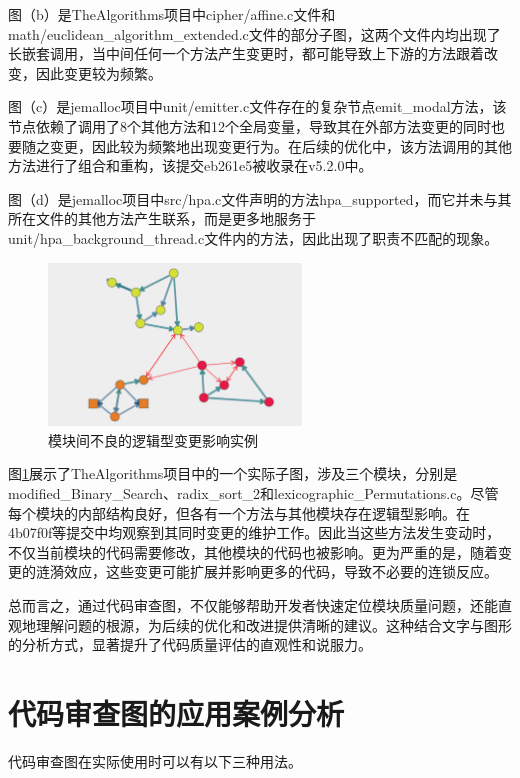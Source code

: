 图（b）是TheAlgorithms项目中cipher/affine.c文件和math/euclidean\_algorithm\_extended.c文件的部分子图，这两个文件内均出现了长嵌套调用，当中间任何一个方法产生变更时，都可能导致上下游的方法跟着改变，因此变更较为频繁。

图（c）是jemalloc项目中unit/emitter.c文件存在的复杂节点emit\_modal方法，该节点依赖了调用了8个其他方法和12个全局变量，导致其在外部方法变更的同时也要随之变更，因此较为频繁地出现变更行为。在后续的优化中，该方法调用的其他方法进行了组合和重构，该提交eb261e5被收录在v5.2.0中。

图（d）是jemalloc项目中src/hpa.c文件声明的方法hpa\_supported，而它并未与其所在文件的其他方法产生联系，而是更多地服务于unit/hpa\_background\_thread.c文件内的方法，因此出现了职责不匹配的现象。

\begin{figure}[h]
\centering
\includegraphics[width = 0.6\textwidth]{figures/不良变更影响.png}
\caption{模块间不良的逻辑型变更影响实例}
\label{1_不良的逻辑型变更影响实例}
\end{figure}


图\ref{1_不良的逻辑型变更影响实例}展示了TheAlgorithms项目中的一个实际子图，涉及三个模块，分别是modified\_Binary\_Search、radix\_sort\_2和lexicographic\_Permutations.c。尽管每个模块的内部结构良好，但各有一个方法与其他模块存在逻辑型影响。在4b07f0f等提交中均观察到其同时变更的维护工作。因此当这些方法发生变动时，不仅当前模块的代码需要修改，其他模块的代码也被影响。更为严重的是，随着变更的涟漪效应，这些变更可能扩展并影响更多的代码，导致不必要的连锁反应。

总而言之，通过代码审查图，不仅能够帮助开发者快速定位模块质量问题，还能直观地理解问题的根源，为后续的优化和改进提供清晰的建议。这种结合文字与图形的分析方式，显著提升了代码质量评估的直观性和说服力。


\section{代码审查图的应用案例分析}

代码审查图在实际使用时可以有以下三种用法。


